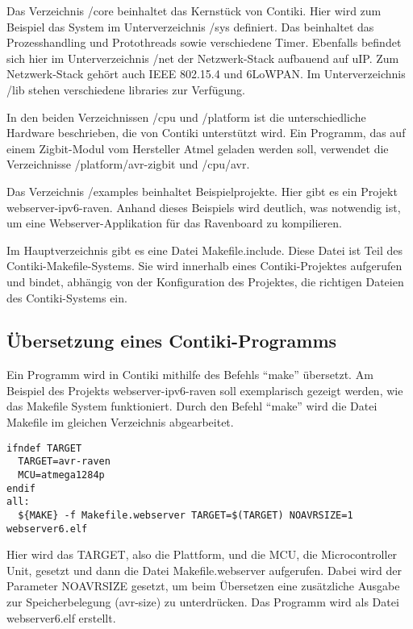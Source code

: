 Das Verzeichnis /core beinhaltet das Kernstück von Contiki. Hier wird zum Beispiel das System im Unterverzeichnis /sys definiert. Das beinhaltet das Prozesshandling und Protothreads sowie verschiedene Timer. Ebenfalls befindet sich hier im Unterverzeichnis /net der Netzwerk-Stack aufbauend auf uIP. Zum Netzwerk-Stack gehört auch IEEE 802.15.4 und 6LoWPAN. Im Unterverzeichnis /lib stehen verschiedene libraries zur Verfügung.

In den beiden Verzeichnissen /cpu und /platform ist die unterschiedliche Hardware beschrieben, die von Contiki unterstützt wird. Ein Programm, das auf einem Zigbit-Modul vom Hersteller Atmel geladen werden soll, verwendet die Verzeichnisse /platform/avr-zigbit und /cpu/avr.

Das Verzeichnis /examples beinhaltet Beispielprojekte. Hier gibt es ein Projekt webserver-ipv6-raven. Anhand dieses Beispiels wird deutlich, was notwendig ist, um eine Webserver-Applikation für das Ravenboard zu kompilieren.

Im Hauptverzeichnis gibt es eine Datei Makefile.include. Diese Datei ist Teil des Contiki-Makefile-Systems. Sie wird innerhalb eines Contiki-Projektes aufgerufen und bindet, abhängig von der Konfiguration des Projektes, die richtigen Dateien des Contiki-Systems ein.

\subsection{Übersetzung eines Contiki-Programms}

Ein Programm wird in Contiki mithilfe des Befehls "`make"' übersetzt. Am Beispiel des Projekts webserver-ipv6-raven soll exemplarisch gezeigt werden, wie das Makefile System funktioniert. Durch den Befehl "`make"' wird die Datei Makefile im gleichen Verzeichnis abgearbeitet.

\begin{lstlisting}[caption=Auszug aus examples/webserver-ipv6-raven/Makefile]
ifndef TARGET
  TARGET=avr-raven
  MCU=atmega1284p
endif
all:
  ${MAKE} -f Makefile.webserver TARGET=$(TARGET) NOAVRSIZE=1 webserver6.elf
\end{lstlisting}

Hier wird das TARGET, also die Plattform, und die MCU, die Microcontroller Unit, gesetzt und dann die Datei Makefile.webserver aufgerufen. Dabei wird der Parameter NOAVRSIZE gesetzt, um beim Übersetzen eine zusätzliche Ausgabe zur Speicherbelegung (avr-size) zu unterdrücken. Das Programm wird als Datei webserver6.elf erstellt.

